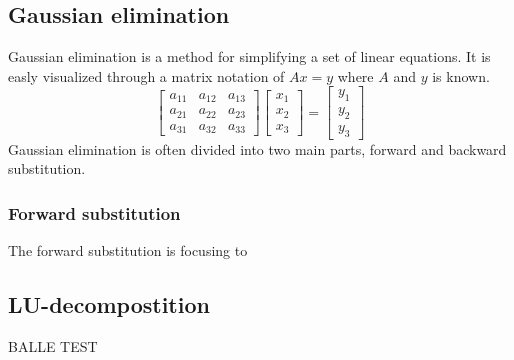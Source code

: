 \documentclass[twoside,twocolumn]{article}
\begin{document}
\subsection{Gaussian elimination}
Gaussian elimination is a method for simplifying a set of linear equations. It is easly visualized through a matrix notation of $Ax = y$ where $A$ and $y$ is known.
\begin{equation}
\begin{bmatrix}
a_11 & a_12 & a_13\\
a_21 & a_22 & a_23\\
a_31 & a_32 & a_33
\end{bmatrix} 
\begin{bmatrix}
x_1 \\ x_2 \\ x_3
\end{bmatrix}=
\begin{bmatrix}
y_1 \\ y_2 \\ y_3
\end{bmatrix}
\end{equation}
Gaussian elimination is often divided into two main parts, forward and backward substitution.
\subsubsection{Forward substitution}
The forward substitution is focusing to 
\subsection{LU-decompostition}
BALLE TEST
\end{document}
